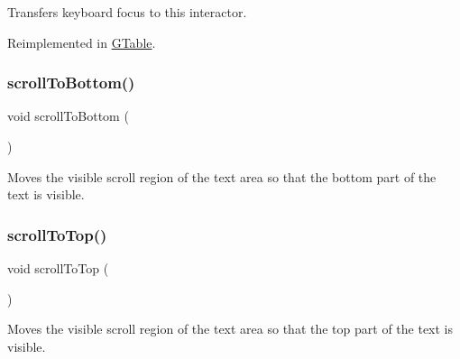 Transfers keyboard focus to this interactor. 



Reimplemented in \mbox{\hyperlink{classsgl_1_1GTable_a5921efd0a5a83eacebdadb749fb3ea7a}{G\+Table}}.

\mbox{\label{classsgl_1_1GTextArea_ad4c9b6140b529865a6cdeed37a339237}} 
\subsubsection{\texorpdfstring{scroll\+To\+Bottom()}{scrollToBottom()}}
{\footnotesize\ttfamily void scroll\+To\+Bottom (\begin{DoxyParamCaption}{ }\end{DoxyParamCaption})\hspace{0.3cm}{\ttfamily [virtual]}}



Moves the visible scroll region of the text area so that the bottom part of the text is visible. 

\mbox{\label{classsgl_1_1GTextArea_a9eacfcf7c186936ed957dd1c8a9c6b64}} 
\subsubsection{\texorpdfstring{scroll\+To\+Top()}{scrollToTop()}}
{\footnotesize\ttfamily void scroll\+To\+Top (\begin{DoxyParamCaption}{ }\end{DoxyParamCaption})\hspace{0.3cm}{\ttfamily [virtual]}}



Moves the visible scroll region of the text area so that the top part of the text is visible. 

\mbox{\label{classsgl_1_1GTextArea_aaeb1320c0553d0d2b8081b750f59a34a}} 
